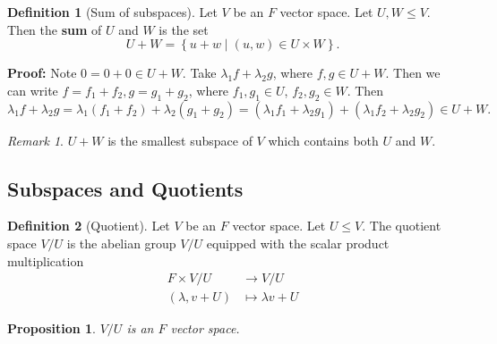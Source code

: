 \documentclass[12pt]{article}
\newtheorem{proposition}{Proposition}[section]
\theoremstyle{definition}
\newtheorem{definition}{Definition}[section]
\theoremstyle{remark}
\newtheorem*{remark}{Remark}
\begin{document}
\begin{definition}[Sum of subspaces]
	Let $V$ be an $F$ vector space. Let $U, W \leq V$. Then the \textbf{sum} of $U$ and $W$ is the set
	\[
		U + W = \left\{ u + w \mid (u, w) \in U \times W \right\}
	.\]
\end{definition}

\begin{adjustbox}{minipage = \columnwidth - 25.5pt, margin=1em, frame=1pt, margin=0em}
\textbf{Proof:} Note $0 = 0 + 0 \in U + W$. Take $\lambda_1 f + \lambda_2 g$, where $f, g \in U + W$. Then we can write $f = f_1 + f_2, g = g_1 + g_2$, where $f_1, g_1 \in U$, $f_2, g_2 \in W$. Then 
\[
	\lambda_1 f + \lambda_2 g = \lambda_1 (f_1 + f_2) + \lambda_2(g_1 + g_2) = (\lambda_1 f_1 + \lambda_2 g_1) + (\lambda_1 f_2 + \lambda_2 g_2) \in U + W
.\]
\end{adjustbox}

\begin{remark}
	$U + W$ is the smallest subspace of $V$ which contains both $U$ and $W$.
\end{remark}

\subsection{Subspaces and Quotients}%
\label{sub:subspaces_and_quotients}

\begin{definition}[Quotient]
	Let $V$ be an $F$ vector space. Let $U \leq V$. The quotient space $V / U$ is the abelian group $V/U$ equipped with the scalar product multiplication
	\begin{align*}
		F \times V/U &\to V/U \\
		(\lambda, v + U) &\mapsto \lambda v + U
	\end{align*}
\end{definition}

\begin{proposition}
	$V/U$ is an $F$ vector space.
\end{proposition}

\newpage

\printindex
\end{document}
